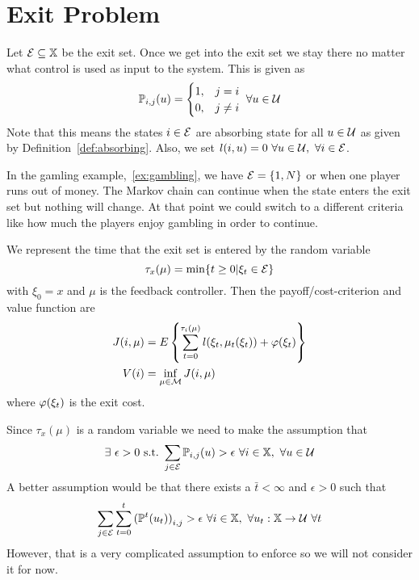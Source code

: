 \mainmatter%
\setcounter{page}{1}

\lectureseries[\course]{\course}

\date{November 5, 2009}

\setaddress%

\setcounter{lecture}{11}
\setcounter{chapter}{11}


\section{Exit Problem}
Let $\mathcal{E}\subseteq\mathbb{X}$ be the exit set.
Once we get into the exit set we stay there no matter what control is used as input to the system.
This is given as
$$\mathbb{P}_{i,j}(u) = \begin{cases} 1, & j=i \\ 0, & j\neq i \end{cases}~\forall u\in\mathcal{U}$$
Note that this means the states $i\in\mathcal{E}$ are absorbing state for all $u\in\mathcal{U}$ as given by Definition~\ref{def:absorbing}.
Also, we set $l(i,u)=0~\forall u\in\mathcal{U},~\forall i\in\mathcal{E}$.

In the gamling example,~\ref{ex:gambling}, we have $\mathcal{E}=\{1,N\}$ or when one player runs out of money.
The Markov chain can continue when the state enters the exit set but nothing will change.
At that point we could switch to a different criteria like how much the players enjoy gambling in order to continue.

We represent the time that the exit set is entered by the random variable
$$\tau_x(\mu) = \min\{t\geq0 | \xi_t\in\mathcal{E}\}$$
with $\xi_0=x$ and $\mu$ is the feedback controller.
Then the payoff/cost-criterion and value function are
\begin{align*}
J(i,\mu) &= E\left\lbrace\sum_{t=0}^{\tau_i(\mu)}l(\xi_t,\mu_t(\xi_t)) + \varphi(\xi_t)\right\rbrace \\
V(i) &= \inf_{\mu\in\mathcal{M}}J(i,\mu)
\end{align*}
where $\varphi(\xi_t)$ is the exit cost.

Since $\tau_x(\mu)$ is a random variable we need to make the assumption that
\begin{align}
\label{eq:tauassumption}
\exists~\epsilon>0 \text{~s.t.~} \sum_{j\in\mathcal{E}}\mathbb{P}_{i,j}(u)>\epsilon~\forall i\in\mathbb{X},~\forall u\in\mathcal{U}
\end{align}
A better assumption would be that there exists a $\bar{t}<\infty$ and $\epsilon>0$ such that
$$\sum_{j\in\mathcal{E}}\sum_{t=0}^t{(\mathbb{P}^t(u_t))}_{i,j}>\epsilon~\forall i\in\mathbb{X},~\forall u_t:\mathbb{X}\to\mathcal{U}~\forall t$$
However, that is a very complicated assumption to enforce so we will not consider it for now.

